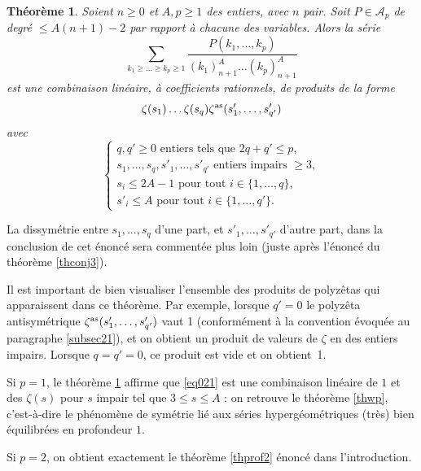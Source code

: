 \documentclass[12pt,francais, reqno]{smfart}
\numberwithin{equation}{section}
\newcommand{\unq}{\{1,\ldots, q\}}
\newcommand{\unqpr}{\{1,\ldots, q'\}}
\newcommand{\zetaantisym}{\zeta^{{\rm as}}}
\newtheorem{Th}{Th\'eor\`eme}
\begin{document}
\begin{Th} \label{thconj1}
Soient $n \geq 0$ et $A, p \geq 1$ des entiers, avec $n$ pair. 
Soit $P \in \mathscr{A}_p$ de degr\'e $\leq A(n+1)-2$ par rapport \`a chacune des variables. Alors la s\'erie
\begin{equation} \label{eq021}
\sum_{k_1 \geq  \ldots \geq   k_p \ge 1} 
\frac{P(k_1, \ldots, k_p)}{(k_1)_{n+1}^{A} \ldots (k_p)_{n+1}^{A} }
\end{equation}
est une combinaison lin\'eaire, \`a coefficients rationnels, de produits de la forme
$$\zeta(s_1) \ldots  \zeta(s_{q}) \zetaantisym (s'_{1}, \ldots, s'_{q'})$$
avec 
\begin{equation} \label{eqcondithconj1}
\left\{
\begin{array}{l}
q, q' \geq 0   \mbox{ entiers tels que } 2q+q' \leq p, \\
s_1, \ldots, s_q, s'_1, \ldots, s'_{q'} \mbox{ entiers impairs } \geq 3, \\
s_i \leq 2A-1  \mbox{ pour tout } i \in \unq, \\
s'_i \leq A  \mbox{ pour tout } i \in \unqpr.
\end{array}
\right.
\end{equation}
\end{Th}

La dissym\'etrie entre $s_1, \ldots, s_q$ d'une part, et $ s'_1, \ldots, s'_{q'} $ 
d'autre part, dans la conclusion de cet \'enonc\'e sera comment\'ee plus loin 
(juste apr\`es l'\'enonc\'e du th\'eor\`eme \ref{thconj3}).

\smallskip

Il est important de bien visualiser l'ensemble des produits de polyz\^etas qui apparaissent dans ce th\'eor\`eme. Par exemple, lorsque $q'=0$ le polyz\^eta antisym\'etrique $ \zetaantisym (s'_{1}, \ldots, s'_{q'})$ vaut 1 (conform\'ement \`a la convention \'evoqu\'ee au paragraphe \ref{subsec21}), et on obtient un produit de valeurs de $\zeta$ en des entiers impairs. Lorsque $q=q'=0$, ce produit est vide et on obtient~1.


Si $p=1$, le th\'eor\`eme \ref{thconj1} affirme que \eqref{eq021} est une
 combinaison lin\'eaire de $1$ et des $\zeta(s)$ pour $s$ impair tel que $3 \leq s \leq A$ : 
on retrouve le th\'eor\`eme \ref{thwp}, c'est-\`a-dire le ph\'enom\`ene de sym\'etrie  
li\'e aux s\'eries hyperg\'eom\'etriques (tr\`es) bien \'equilibr\'ees  en profondeur $1$.

Si $p=2$, on obtient exactement le th\'eor\`eme \ref{thprof2} \'enonc\'e dans l'introduction.
\end{document}
